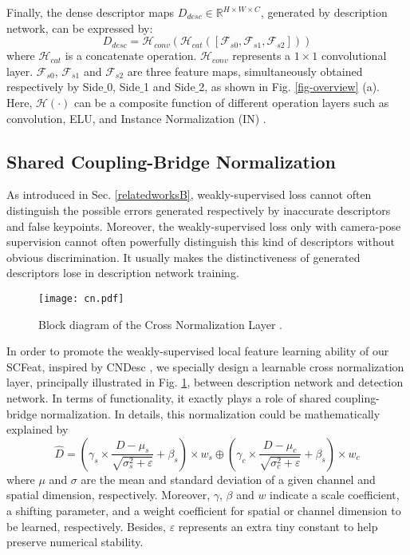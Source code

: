 \documentclass[journal]{IEEEtran}
\begin{document}
Finally, the dense descriptor maps $D_{desc}\in\mathbb{R}^{H\times W\times C}$, generated by description network, can be expressed by:
\begin{equation}\label{eq-ddm}
        D_{desc}=\mathcal{H}_{conv}(\mathcal{H}_{cat}([\mathcal{F}_{s0},\mathcal{F}_{s1},\mathcal{F}_{s2}]))
\end{equation}
where $\mathcal{H}_{cat}$ is a concatenate operation.  $\mathcal{H}_{conv}$ represents a $1\times1$ convolutional layer. $\mathcal{F}_{s0}$, $\mathcal{F}_{s1}$ and $\mathcal{F}_{s2}$ are three feature maps, simultaneously obtained respectively by Side$\_$0, Side$\_$1 and Side$\_$2, as shown in Fig. \ref{fig-overview} (a). 
Here, $\mathcal{H}(\cdot)$ can be a composite function of different operation layers such as convolution, ELU, and Instance Normalization (IN) \cite{IN}.






\subsection{Shared Coupling-Bridge Normalization}\label{CN}

As introduced in Sec. \ref{relatedworksB}, weakly-supervised loss cannot often distinguish the possible errors generated respectively by inaccurate descriptors and false keypoints. Moreover, the weakly-supervised loss only with camera-pose supervision cannot often powerfully distinguish this kind of descriptors without obvious discrimination. It usually makes the distinctiveness of generated descriptors lose in description network training. 
\begin{figure}[h]
\centering
\texttt{[image: cn.pdf]}
\caption{Block diagram of the Cross Normalization Layer \cite{cndesc}.}
\label{fig_cnl}
\end{figure}



In order to promote the weakly-supervised local feature learning ability of our SCFeat,  
inspired by CNDesc \cite{cndesc}, we specially design a learnable cross normalization layer, principally illustrated in Fig. \ref{fig_cnl}, between description network and detection network. 
In terms of functionality, it exactly plays a role of shared coupling-bridge normalization.
In details, this normalization could be mathematically explained by
\begin{equation}\label{eq-cn}
        \hat{D}=(\gamma_s \times\frac{D-\mu_s}{\sqrt{\sigma_s^{2}+\varepsilon}}+\beta_s)\times w_s
        \oplus
        (\gamma_c \times\frac{D-\mu_c}{\sqrt{\sigma_c^{2}+\varepsilon}}+\beta_s)\times w_c
\end{equation}
where $\mu$ and $\sigma$ are the mean and standard deviation of a given channel and spatial dimension, respectively. Moreover, $\gamma$, $\beta$ and $w$ indicate a scale coefficient, a shifting parameter, and a weight coefficient for spatial or channel dimension to be learned, respectively. Besides, $\varepsilon$ represents an extra tiny constant to help preserve numerical stability.
\end{document}
